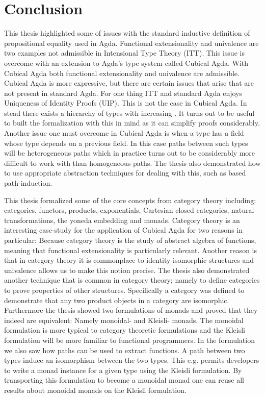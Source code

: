 \chapter{Conclusion}
This thesis highlighted some of issues with the standard inductive definition of
propositional equality used in Agda. Functional extensionality and univalence
are two examples not admissible in Intensional Type Theory (ITT). This issue is
overcome with an extension to Agda's type system called Cubical Agda. With
Cubical Agda both functional extensionality and univalence are admissible.
Cubical Agda is more expressive, but there are certain issues that arise that
are not present in standard Agda. For one thing ITT and standard Agda enjoys
Uniqueness of Identity Proofs (UIP). This is not the case in Cubical Agda. In
stead there exists a hierarchy of types with increasing . It turns out to be useful to built the formalization with this in
mind as it can simplify proofs considerably. Another issue one must overcome in
Cubical Agda is when a type has a field whose type depends on a previous field.
In this case paths between such types will be heterogeneous paths which in
practice turns out to be considerably more difficult to work with than
homogeneous paths. The thesis also demonstrated how to use appropriate
abstraction techniques for dealing with this, such as based path-induction.

This thesis formalized some of the core concepts from category theory including;
categories, functors, products, exponentials, Cartesian closed categories,
natural transformations, the yoneda embedding and monads. Category theory is an
interesting case-study for the application of Cubical Agda for two reasons in
particular: Because category theory is the study of abstract algebra of
functions, meaning that functional extensionality is particularly relevant.
Another reason is that in category theory it is commonplace to identity
isomorphic structures and univalence allows us to make this notion precise. The
thesis also demonstrated another technique that is common in category theory;
namely to define categories to prove properties of other structures.
Specifically a category was defined to demonstrate that any two product objects
in a category are isomorphic. Furthermore the thesis showed two formulations of
monads and proved that they indeed are equivalent: Namely monoidal- and Kleisli-
monads. The monoidal formulation is more typical to category theoretic
formulations and the Kleisli formulation will be more familiar to functional
programmers. In the formulation we also saw how paths can be used to extract
functions. A path between two types induce an isomorphism between the two types.
This e.g. permits developers to write a monad instance for a given type using
the Kleisli formulation. By transporting this formulation to become a monoidal
monad one can reuse all results about monoidal monads on the Kleisli
formulation.
